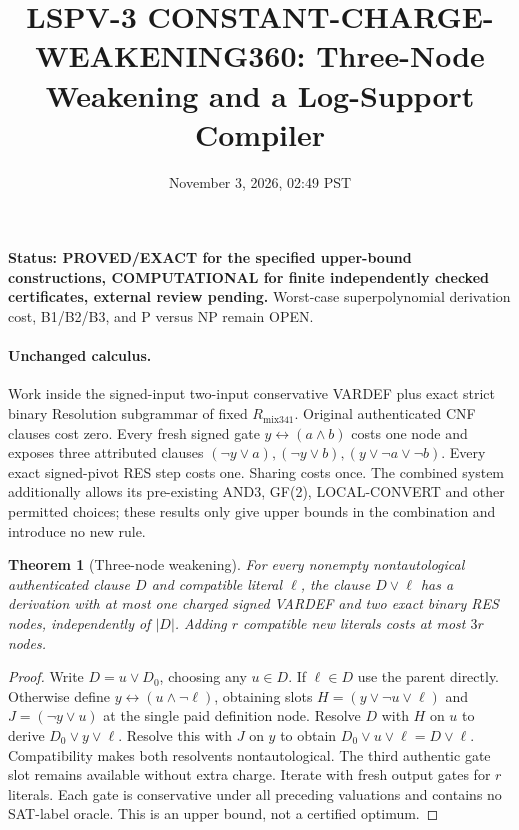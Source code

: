 \documentclass[11pt]{article}
\title{LSPV-3 CONSTANT-CHARGE-WEAKENING360: Three-Node Weakening and a Log-Support Compiler}
\date{November 3, 2026, 02:49 PST}
\newtheorem{theorem}{Theorem}
\begin{document}
\maketitle
\noindent\textbf{Status: PROVED/EXACT for the specified upper-bound constructions, COMPUTATIONAL for finite independently checked certificates, external review pending.} Worst-case superpolynomial derivation cost, B1/B2/B3, and P versus NP remain OPEN.

\paragraph{Unchanged calculus.} Work inside the signed-input two-input conservative VARDEF plus exact strict binary Resolution subgrammar of fixed $R_{\mathrm{mix341}}$. Original authenticated CNF clauses cost zero. Every fresh signed gate $y\leftrightarrow(a\land b)$ costs one node and exposes three attributed clauses $(\neg y\vee a),(\neg y\vee b),(y\vee\neg a\vee\neg b)$. Every exact signed-pivot RES step costs one. Sharing costs once. The combined system additionally allows its pre-existing AND3, GF(2), LOCAL-CONVERT and other permitted choices; these results only give upper bounds in the combination and introduce no new rule.

\begin{theorem}[Three-node weakening]
For every nonempty nontautological authenticated clause $D$ and compatible literal $\ell$, the clause $D\vee\ell$ has a derivation with at most one charged signed VARDEF and two exact binary RES nodes, independently of $|D|$. Adding $r$ compatible new literals costs at most $3r$ nodes.
\end{theorem}
\begin{proof}
Write $D=u\vee D_0$, choosing any $u\in D$. If $\ell\in D$ use the parent directly. Otherwise define $y\leftrightarrow(u\land\neg\ell)$, obtaining slots $H=(y\vee\neg u\vee\ell)$ and $J=(\neg y\vee u)$ at the single paid definition node. Resolve $D$ with $H$ on $u$ to derive $D_0\vee y\vee\ell$. Resolve this with $J$ on $y$ to obtain $D_0\vee u\vee\ell=D\vee\ell$. Compatibility makes both resolvents nontautological. The third authentic gate slot remains available without extra charge. Iterate with fresh output gates for $r$ literals. Each gate is conservative under all preceding valuations and contains no SAT-label oracle. This is an upper bound, not a certified optimum.
\end{proof}
\end{document}
